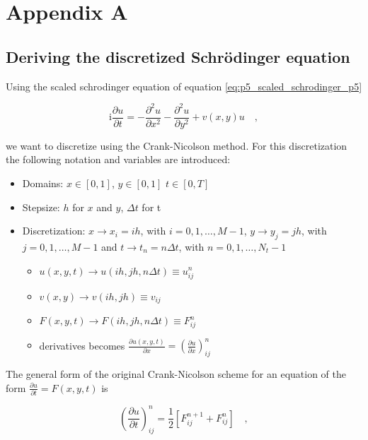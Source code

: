 \documentclass[../main_proj5.tex]{subfiles}
\begin{document}
\onecolumngrid
\appendix
\section{Appendix A}\label{app:p5_AppendixA}

\subsection{Deriving the discretized Schr\"odinger equation}\label{app:p5_AppendixA_discretized schrodinger}

Using the scaled schrodinger equation of equation \eqref{eq:p5_scaled_schrodinger_p5}

\begin{equation}
    \label{eq:appA_scaled_schrodinger}
    \text{i}\frac{\partial u}{\partial t} =
    -\frac{\partial^{2}u}{\partial x^{2}} - \frac{\partial^{2} u}{\partial y^{2}} + v(x,y ) u \quad,
\end{equation}

\noindent we want to discretize using the Crank-Nicolson method. For this discretization the following notation and variables are introduced: 
\begin{itemize}
    \item Domains: $x\in[0, 1]$, $y\in[0, 1]$ $t\in[0, T]$
    \item Stepsize: $h$ for $x$ and $y$, $\Delta t$ for t
    \item Discretization: $x \rightarrow x_i = i h$, with $i = 0, 1, \ldots, M-1$, $y \rightarrow y_j = j h$, with $j = 0, 1, \ldots, M-1$ and $t \rightarrow t_n = n \Delta t$, with $n = 0, 1, \ldots, N_t-1$
    \begin{itemize}
        \item $u(x,y,t) \rightarrow u(ih,jh,n \Delta t) \equiv u_{ij}^n$
        \item $v(x,y) \rightarrow v(ih,jh) \equiv v_{ij}$
        \item $F(x, y, t)\rightarrow F(ih,jh,n \Delta t) \equiv F_{ij}^n$
        \item derivatives becomes $\frac{\partial u(x,y,t)}{\partial x} = \left(\frac{\partial u}{\partial x}\right)_{ij}^{n}$
    \end{itemize}
\end{itemize}

The general form of the original Crank-Nicolson scheme for an equation of the form $\frac{\partial u}{\partial t} = F(x, y, t)$ is 

\begin{equation}
    \label{eq:app_p5_general_Crank_Nicolson}
    \left(\frac{\partial u}{\partial t} \right)_{ij}^n = 
    \frac{1}{2}\left[F_{ij}^{n+1} + F_{ij}^{n}\right] \quad, 
\end{equation}
\end{document}
